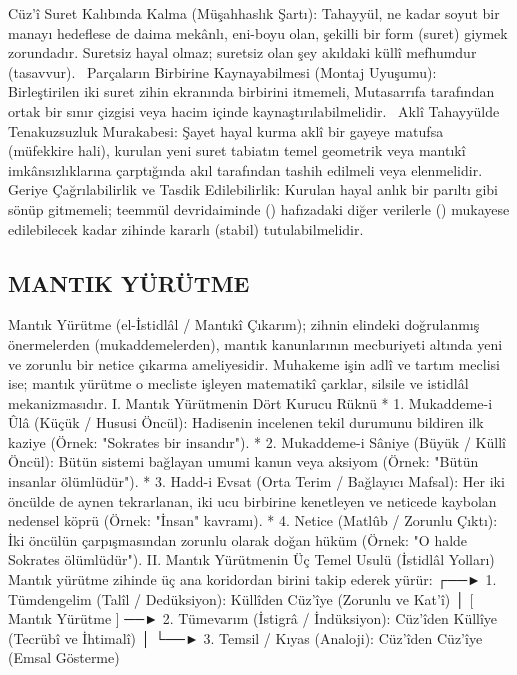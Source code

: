 \documentclass[11pt,a4paper]{article}
\begin{document}
 Cüz'î Suret Kalıbında Kalma (Müşahhaslık Şartı):
Tahayyül, ne kadar soyut bir manayı hedeflese de daima mekânlı, eni-boyu olan, şekilli bir form (suret) giymek zorundadır. Suretsiz hayal olmaz; suretsiz olan şey akıldaki küllî mefhumdur (tasavvur).  
 Parçaların Birbirine Kaynayabilmesi (Montaj Uyuşumu):
Birleştirilen iki suret zihin ekranında birbirini itmemeli, Mutasarrıfa tarafından ortak bir sınır çizgisi veya hacim içinde kaynaştırılabilmelidir.  
 Aklî Tahayyülde Tenakuzsuzluk Murakabesi:
Şayet hayal kurma aklî bir gayeye matufsa (müfekkire hali), kurulan yeni suret tabiatın temel geometrik veya mantıkî imkânsızlıklarına çarptığında akıl tarafından tashih edilmeli veya elenmelidir.
 Geriye Çağrılabilirlik ve Tasdik Edilebilirlik:
Kurulan hayal anlık bir parıltı gibi sönüp gitmemeli; teemmül devridaiminde () hafızadaki diğer verilerle () mukayese edilebilecek kadar zihinde kararlı (stabil) tutulabilmelidir. 



\subsection{MANTIK YÜRÜTME}


Mantık Yürütme (el-İstidlâl / Mantıkî Çıkarım); zihnin elindeki doğrulanmış önermelerden (mukaddemelerden), mantık kanunlarının mecburiyeti altında yeni ve zorunlu bir netice çıkarma ameliyesidir.
Muhakeme işin adlî ve tartım meclisi ise; mantık yürütme o mecliste işleyen matematikî çarklar, silsile ve istidlâl mekanizmasıdır.
I. Mantık Yürütmenin Dört Kurucu Rüknü
 * 1. Mukaddeme-i Ûlâ (Küçük / Hususi Öncül): Hadisenin incelenen tekil durumunu bildiren ilk kaziye (Örnek: "Sokrates bir insandır").
 * 2. Mukaddeme-i Sâniye (Büyük / Küllî Öncül): Bütün sistemi bağlayan umumi kanun veya aksiyom (Örnek: "Bütün insanlar ölümlüdür").
 * 3. Hadd-i Evsat (Orta Terim / Bağlayıcı Mafsal): Her iki öncülde de aynen tekrarlanan, iki ucu birbirine kenetleyen ve neticede kaybolan nedensel köprü (Örnek: "İnsan" kavramı).
 * 4. Netice (Matlûb / Zorunlu Çıktı): İki öncülün çarpışmasından zorunlu olarak doğan hüküm (Örnek: "O halde Sokrates ölümlüdür").
II. Mantık Yürütmenin Üç Temel Usulü (İstidlâl Yolları)
Mantık yürütme zihinde üç ana koridordan birini takip ederek yürür:
                  ┌──► 1. Tümdengelim (Talîl / Dedüksiyon): Küllîden Cüz'îye (Zorunlu ve Kat'î)
                  │
[ Mantık Yürütme ] ──► 2. Tümevarım (İstigrâ / İndüksiyon): Cüz'îden Küllîye (Tecrübî ve İhtimalî)
                  │
                  └──► 3. Temsil / Kıyas (Analoji): Cüz'îden Cüz'îye (Emsal Gösterme)
\end{document}
